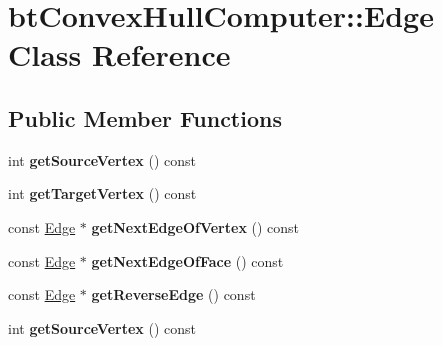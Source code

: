 \hypertarget{classbtConvexHullComputer_1_1Edge}{}\section{bt\+Convex\+Hull\+Computer\+:\+:Edge Class Reference}
\label{classbtConvexHullComputer_1_1Edge}
\subsection*{Public Member Functions}
\begin{DoxyCompactItemize}
\item 
\mbox{\label{classbtConvexHullComputer_1_1Edge_a680d441357893ef22dedc3a26c6b1d08}} 
int {\bfseries get\+Source\+Vertex} () const
\item 
\mbox{\label{classbtConvexHullComputer_1_1Edge_ac86a1e361b226d36074b502f548325bb}} 
int {\bfseries get\+Target\+Vertex} () const
\item 
\mbox{\label{classbtConvexHullComputer_1_1Edge_aa35c898e94e4dc5e4adf4cf91c3898ea}} 
const \hyperlink{classbtConvexHullComputer_1_1Edge}{Edge} $\ast$ {\bfseries get\+Next\+Edge\+Of\+Vertex} () const
\item 
\mbox{\label{classbtConvexHullComputer_1_1Edge_a5c140dbc46067408b152d9b9dc603b28}} 
const \hyperlink{classbtConvexHullComputer_1_1Edge}{Edge} $\ast$ {\bfseries get\+Next\+Edge\+Of\+Face} () const
\item 
\mbox{\label{classbtConvexHullComputer_1_1Edge_a8eacf89c7ffd78a17878241ecc59062e}} 
const \hyperlink{classbtConvexHullComputer_1_1Edge}{Edge} $\ast$ {\bfseries get\+Reverse\+Edge} () const
\item 
\mbox{\label{classbtConvexHullComputer_1_1Edge_a680d441357893ef22dedc3a26c6b1d08}} 
int {\bfseries get\+Source\+Vertex} () const
\item 
\mbox{\label{classbtConvexHullComputer_1_1Edge_ac86a1e361b226d36074b502f548325bb}} 

\end{DoxyCompactItemize}
